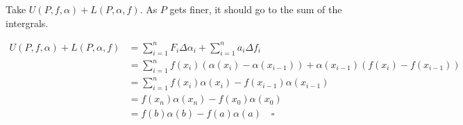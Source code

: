 \documentclass[12pt]{article}
\begin{document}
Take $U(P, f, \alpha) + L(P, \alpha, f)$.
As $P$ gets finer, it should go to the sum of the intergrals.

\begin{align*}
  U(P, f, \alpha) + L(P, \alpha, f)
  &= \sum_{i=1}^{n} F_i \Delta \alpha_i + \sum_{i=1}^{n} a_i \Delta f_i \\
  &= \sum_{i=1}^{n} f(x_i)(\alpha(x_i)-\alpha(x_{i-1}))+\alpha(x_{i-1})(f(x_i)-f(x_{i-1})) \\
  &= \sum_{i=1}^{n} f(x_i)\alpha(x_i) - f(x_{i-1})\alpha(x_{i-1}) \\
  &= f(x_n)\alpha(x_n) - f(x_0)\alpha(x_0) \\
  &= f(b)\alpha(b)-f(a)\alpha(a)\quad\square
\end{align*}
\end{document}
